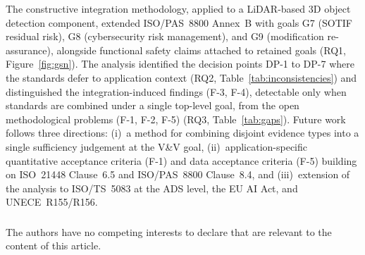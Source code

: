 \documentclass[runningheads]{llncs}
\begin{document}
	The constructive integration methodology, applied to a LiDAR-based 3D object detection component, extended ISO/PAS~8800 Annex~B with goals G7 (SOTIF residual risk), G8 (cybersecurity risk management), and G9 (modification re-assurance), alongside functional safety claims attached to retained goals (RQ1, Figure~\ref{fig:gsn}). The analysis identified the decision points DP-1 to DP-7 where the standards defer to application context (RQ2, Table~\ref{tab:inconsistencies}) and distinguished the integration-induced findings (F-3, F-4), detectable only when standards are combined under a single top-level goal, from the open methodological problems (F-1, F-2, F-5) (RQ3, Table~\ref{tab:gaps}). Future work follows three directions: (i)~a method for combining disjoint evidence types into a single sufficiency judgement at the V\&V goal, (ii)~application-specific quantitative acceptance criteria (F-1) and data acceptance criteria (F-5) building on ISO~21448 Clause~6.5 and ISO/PAS~8800 Clause~8.4, and (iii)~extension of the analysis to ISO/TS~5083 at the ADS level, the EU AI Act, and UNECE~R155/R156.
	
	\begin{credits}
		\subsubsection{\discintname}
		The authors have no competing interests to declare that are relevant to the content of this article.
	\end{credits}
	
	
	
\end{document}
